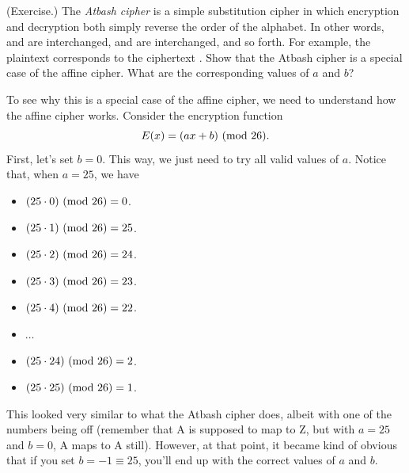 \documentclass[letterpaper]{article}
\newcommand{\0}{\mathbf{0}}
\begin{document}
\begin{mdframed}
    (Exercise.) The \emph{Atbash cipher} is a simple substitution cipher in which encryption and decryption both simply reverse the order of the alphabet. In other words,  and  are interchanged,  and  are interchanged, and so forth. For example, the plaintext  corresponds to the ciphertext . Show that the Atbash cipher is a special case of the affine cipher. What are the corresponding values of $a$ and $b$? 
    
    \begin{mdframed}
        To see why this is a special case of the affine cipher, we need to understand how the affine cipher works. Consider the encryption function \[E(x) = (ax + b) \ (\mathrm{mod}\ 26).\] First, let's set $b = 0$. This way, we just need to try all valid values of $a$. Notice that, when $a = 25$, we have 
        \begin{itemize}
            \item $(25 \cdot 0) \ (\mathrm{mod}\ 26) = 0$.
            \item $(25 \cdot 1) \ (\mathrm{mod}\ 26) = 25$.
            \item $(25 \cdot 2) \ (\mathrm{mod}\ 26) = 24$.
            \item $(25 \cdot 3) \ (\mathrm{mod}\ 26) = 23$.
            \item $(25 \cdot 4) \ (\mathrm{mod}\ 26) = 22$.
            \item $\hdots$
            \item $(25 \cdot 24) \ (\mathrm{mod}\ 26) = 2$.
            \item $(25 \cdot 25) \ (\mathrm{mod}\ 26) = 1$.
        \end{itemize}
        This looked very similar to what the Atbash cipher does, albeit with one of the numbers being off (remember that A is supposed to map to Z, but with $a = 25$ and $b = 0$, A maps to A still). However, at that point, it became kind of obvious that if you set $b = -1 \equiv 25$, you'll end up with the correct values of $a$ and $b$.
    \end{mdframed}
\end{mdframed}
\end{document}
